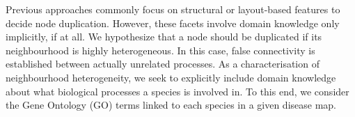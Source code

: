 \documentclass[
	fontsize=10pt, %
	twoside=true, %
	secnumdepth=1, %
  toc=indentunnumbered %
]{kaobook}
\begin{document}




Previous approaches commonly focus on structural or layout-based features to
decide node duplication.
However, these facets involve domain knowledge only implicitly, if at all.
We hypothesize that a node should be duplicated if its neighbourhood is highly
heterogeneous. In this case, false connectivity is established between actually
unrelated processes.
As a characterisation of neighbourhood heterogeneity, we seek
to explicitly include domain knowledge about what biological processes a species
is involved in. To this end, we consider the Gene Ontology (GO) terms linked to each
species in a given disease map.
\end{document}
